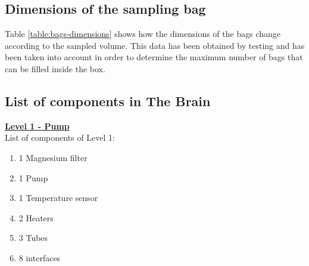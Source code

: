 \documentclass[a4paper,12pt,oneside]{article}
\begin{document}
\begin{appendices}
\subsection{Dimensions of the sampling bag}
\label{dimensions-bags}

Table \ref{table:bags-dimensions} shows how the dimensions of the bags change according to the sampled volume. This data has been obtained by testing and has been taken into account in order to determine the maximum number of bags that can be filled inside the box.

\begin{table}[H]
\noindent{}
\caption{Dimensions of the Bags When Filled with Different Air Sample Volumes.}
\label{table:bags-dimensions}
\end{table}
\subsection{List of components in The Brain}
\label{list-of-components-brain}
\textbf{\underline{Level 1 - Pump}}
\\
List of components of Level 1:

\begin{enumerate}[label=\Alph*.]
    \item 1 Magnesium filter
    \item 1 Pump
    \item 1 Temperature sensor
    \item 2 Heaters
    \item 3 Tubes
    \item 8 interfaces
\end{enumerate}


\end{appendices}
\end{document}
